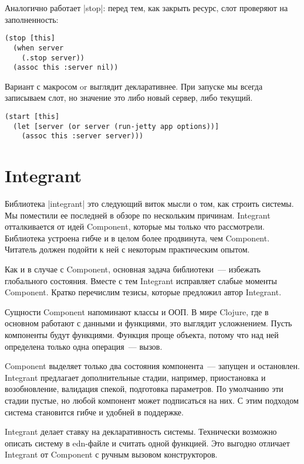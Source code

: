 Аналогично работает \spverb|stop|: перед тем, как закрыть ресурс, слот проверяют на
заполненность:

\begin{verbatim}
(stop [this]
  (when server
    (.stop server))
  (assoc this :server nil))
\end{verbatim}

Вариант с макросом or выглядит декларативнее. При запуске мы всегда записываем
слот, но значение это либо новый сервер, либо текущий.

\begin{verbatim}
(start [this]
  (let [server (or server (run-jetty app options))]
    (assoc this :server server)))
\end{verbatim}

\section{Integrant}

Библиотека \spverb|integrant|
это следующий виток мысли о том, как строить системы. Мы поместили ее последней
в обзоре по нескольким причинам. Integrant отталкивается от идей Component,
которые мы только что рассмотрели. Библиотека устроена гибче и в целом более
продвинута, чем Component. Читатель должен подойти к ней с некоторым
практическим опытом.

Как и в случае с Component, основная задача библиотеки~--- избежать глобального
состояния. Вместе с тем Integrant исправляет слабые моменты Component. Кратко
перечислим тезисы, которые предложил автор Integrant.

Сущности Component напоминают классы и ООП. В мире Clojure, где в основном
работают с данными и функциями, это выглядит усложнением. Пусть компоненты будут
функциями. Функция проще объекта, потому что над ней определена только одна
операция~--- вызов.

Component выделяет только два состояния компонента~--- запущен и
остановлен. Integrant предлагает дополнительные стадии, например, приостановка и
возобновление, валидация спекой, подготовка параметров. По умолчанию эти стадии
пустые, но любой компонент может подписаться на них. С этим подходом система
становится гибче и удобней в поддержке.

Integrant делает ставку на декларативность системы. Технически возможно описать
систему в edn-файле и считать одной функцией. Это выгодно отличает Integrant от
Component с ручным вызовом конструкторов.

